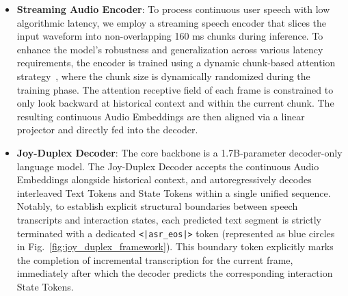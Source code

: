 \begin{itemize}
    \item \textbf{Streaming Audio Encoder}: 
    To process continuous user speech with low algorithmic latency, we employ a streaming speech encoder that slices the input waveform into non-overlapping 160 ms chunks during inference. To enhance the model's robustness and generalization across various latency requirements, the encoder is trained using a dynamic chunk-based attention strategy~\cite{zhang2020unified}, where the chunk size is dynamically randomized during the training phase. The attention receptive field of each frame is constrained to only look backward at historical context and within the current chunk. The resulting continuous Audio Embeddings are then aligned via a linear projector and directly fed into the decoder.
    
    \item \textbf{Joy-Duplex Decoder}: The core backbone is a 1.7B-parameter decoder-only language model. The Joy-Duplex Decoder accepts the continuous Audio Embeddings alongside historical context, and autoregressively decodes interleaved Text Tokens and State Tokens within a single unified sequence. Notably, to establish explicit structural boundaries between speech transcripts and interaction states, each predicted text segment is strictly terminated with a dedicated \texttt{<|asr\_eos|>} token (represented as blue circles in Fig.~\ref{fig:joy_duplex_framework}). This boundary token explicitly marks the completion of incremental transcription for the current frame, immediately after which the decoder predicts the corresponding interaction State Tokens.
\end{itemize}

